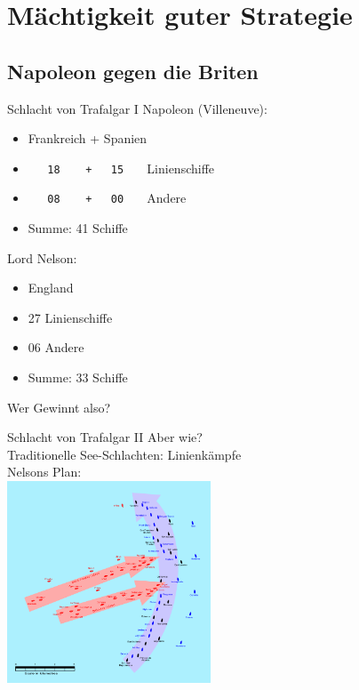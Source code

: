 \section{Mächtigkeit guter Strategie}

\subsection{Napoleon gegen die Briten}

\begin{frame}[c, fragile]{Schlacht von Trafalgar I}
    Napoleon (Villeneuve):
    \begin{itemize}
        \item Frankreich + Spanien
        \item<2-> \verb!   18    +   15   ! Linienschiffe
        \item<2-> \verb!   08    +   00   ! Andere
        \item<3-> Summe: 41 Schiffe
    \end{itemize}

    Lord Nelson:
    \begin{itemize}
        \item England
        \item<2-> 27 Linienschiffe
        \item<2-> 06 Andere
        \item<3-> Summe: 33 Schiffe
    \end{itemize}
    \pause
    \pause
    \pause

    Wer Gewinnt also?
\end{frame}

\begin{frame}{Schlacht von Trafalgar II}
    Aber wie? \\
    \pause
    Traditionelle See-Schlachten: Linienkämpfe \\
    \pause
    Nelsons Plan: \\
    \includegraphics[height=6cm]{strategy/Trafalgar-1200hr.jpg}
\end{frame}

